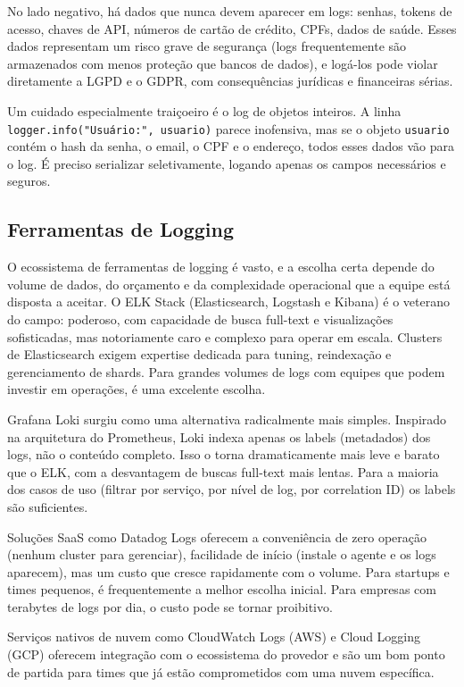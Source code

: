No lado negativo, há dados que nunca devem aparecer em logs: senhas, tokens de
acesso, chaves de API, números de cartão de crédito, CPFs, dados de saúde. Esses
dados representam um risco grave de segurança (logs frequentemente são armazenados
com menos proteção que bancos de dados), e logá-los pode violar
diretamente a LGPD e o GDPR, com consequências jurídicas e financeiras sérias.

Um cuidado especialmente traiçoeiro é o log de objetos inteiros. A linha
\texttt{logger.info("Usuário:", usuario)} parece inofensiva, mas se o objeto
\texttt{usuario} contém o hash da senha, o email, o CPF e o endereço, todos
esses dados vão para o log. É preciso serializar seletivamente, logando apenas
os campos necessários e seguros.

\subsection{Ferramentas de Logging}

O ecossistema de ferramentas de logging é vasto, e a escolha certa depende do
volume de dados, do orçamento e da complexidade operacional que a equipe está
disposta a aceitar. O ELK Stack (Elasticsearch, Logstash e Kibana) é o
veterano do campo: poderoso, com capacidade de busca full-text e visualizações
sofisticadas, mas notoriamente caro e complexo para operar em escala. Clusters
de Elasticsearch exigem expertise dedicada para tuning, reindexação e
gerenciamento de shards. Para grandes volumes de logs com equipes que podem
investir em operações, é uma excelente escolha.

Grafana Loki surgiu como uma alternativa radicalmente mais simples. Inspirado na
arquitetura do Prometheus, Loki indexa apenas os labels (metadados) dos logs,
não o conteúdo completo. Isso o torna dramaticamente mais leve e barato que o
ELK, com a desvantagem de buscas full-text mais lentas. Para a maioria dos casos
de uso (filtrar por serviço, por nível de log, por correlation ID) os labels
são suficientes.

Soluções SaaS como Datadog Logs oferecem a conveniência de zero operação
(nenhum cluster para gerenciar), facilidade de início (instale o agente e os
logs aparecem), mas um custo que cresce rapidamente com o volume. Para startups
e times pequenos, é frequentemente a melhor escolha inicial. Para empresas com
terabytes de logs por dia, o custo pode se tornar proibitivo.

Serviços nativos de nuvem como CloudWatch Logs (AWS) e Cloud Logging (GCP)
oferecem integração com o ecossistema do provedor e são um bom ponto
de partida para times que já estão comprometidos com uma nuvem específica.

